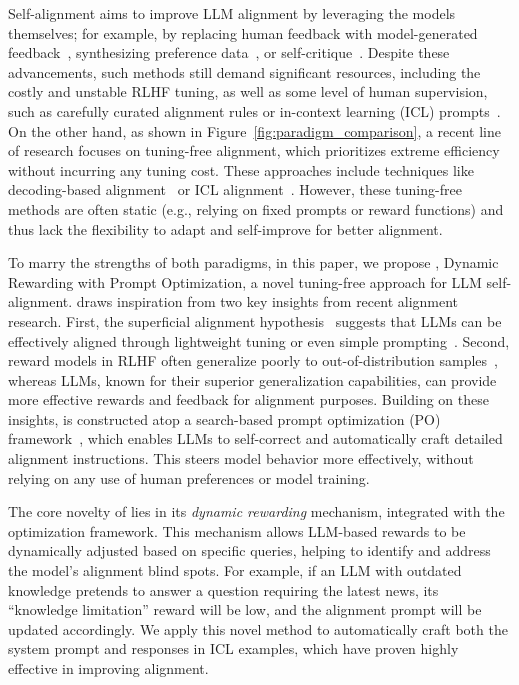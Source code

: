 Self-alignment aims to improve LLM alignment by leveraging the models themselves; for example, by replacing human feedback with model-generated feedback~\cite{lee2023rlaif}, synthesizing preference data~\cite{kim2023aligning, sun2024principle}, or self-critique~\cite{bai2022constitutional}. Despite these advancements, such methods still demand significant resources, including the costly and unstable RLHF tuning, as well as some level of human supervision, such as carefully curated alignment rules or in-context learning (ICL) prompts~\cite{sun2024principle}. On the other hand, as shown in Figure~\ref{fig:paradigm_comparison}, a recent line of research focuses on tuning-free alignment, which prioritizes extreme efficiency without incurring any tuning cost. These approaches include techniques like decoding-based alignment~\cite{li2023rain, wang2024inferaligner} or ICL alignment~\cite{han2023context, Lin2024ReAlign, zhao2024context}. However, these tuning-free methods are often static (e.g., relying on fixed prompts or reward functions) and thus lack the flexibility to adapt and self-improve for better alignment. 




To marry the strengths of both paradigms, in this paper, we propose \ours, Dynamic Rewarding with Prompt Optimization, a novel tuning-free approach for LLM self-alignment. \ours draws inspiration from two key insights from recent alignment research. First, the superficial alignment hypothesis~\cite{zhou2024lima} suggests that LLMs can be effectively aligned through lightweight tuning or even simple prompting~\cite{Lin2024ReAlign, zhao2024context}. Second, reward models in RLHF often generalize poorly to out-of-distribution samples~\cite{burns2023weak}, whereas LLMs, known for their superior generalization capabilities, can provide more effective rewards and feedback for alignment purposes. Building on these insights, \ours is constructed atop a search-based prompt optimization (PO) framework~\cite{pryzant2023automatic, hao2023reasoning, wang2023promptagent}, which enables LLMs to self-correct and automatically craft detailed alignment instructions. This steers model behavior more effectively, without relying on any use of human preferences or model training. 




The core novelty of \ours lies in its \textit{dynamic rewarding} mechanism, integrated with the optimization framework. This mechanism allows LLM-based rewards to be dynamically adjusted based on specific queries, helping to identify and address the model's alignment blind spots. For example, if an LLM with outdated knowledge pretends to answer a question requiring the latest news, its ``knowledge limitation'' reward will be low, and the alignment prompt will be updated accordingly. We apply this novel method to automatically craft both the system prompt and responses in ICL examples, which have proven highly effective in improving alignment.




